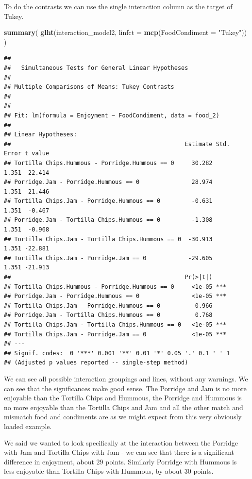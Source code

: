 \documentclass[
]{book}
\newenvironment{Shaded}{\begin{snugshade}}{\end{snugshade}}
\newcommand{\DataTypeTok}[1]{\textcolor[rgb]{0.13,0.29,0.53}{#1}}
\newcommand{\KeywordTok}[1]{\textcolor[rgb]{0.13,0.29,0.53}{\textbf{#1}}}
\newcommand{\NormalTok}[1]{#1}
\newcommand{\StringTok}[1]{\textcolor[rgb]{0.31,0.60,0.02}{#1}}
\begin{document}
To do the contrasts we can use the single interaction column as the target of Tukey.

\begin{Shaded}
\begin{Highlighting}[]
\KeywordTok{summary}\NormalTok{(}
  \KeywordTok{glht}\NormalTok{(interaction_model2, }\DataTypeTok{linfct =} \KeywordTok{mcp}\NormalTok{(}\DataTypeTok{FoodCondiment =} \StringTok{"Tukey"}\NormalTok{))}
\NormalTok{  )}
\end{Highlighting}
\end{Shaded}

\begin{verbatim}
## 
## 	 Simultaneous Tests for General Linear Hypotheses
## 
## Multiple Comparisons of Means: Tukey Contrasts
## 
## 
## Fit: lm(formula = Enjoyment ~ FoodCondiment, data = food_2)
## 
## Linear Hypotheses:
##                                                  Estimate Std. Error t value
## Tortilla Chips.Hummous - Porridge.Hummous == 0     30.282      1.351  22.414
## Porridge.Jam - Porridge.Hummous == 0               28.974      1.351  21.446
## Tortilla Chips.Jam - Porridge.Hummous == 0         -0.631      1.351  -0.467
## Porridge.Jam - Tortilla Chips.Hummous == 0         -1.308      1.351  -0.968
## Tortilla Chips.Jam - Tortilla Chips.Hummous == 0  -30.913      1.351 -22.881
## Tortilla Chips.Jam - Porridge.Jam == 0            -29.605      1.351 -21.913
##                                                  Pr(>|t|)    
## Tortilla Chips.Hummous - Porridge.Hummous == 0     <1e-05 ***
## Porridge.Jam - Porridge.Hummous == 0               <1e-05 ***
## Tortilla Chips.Jam - Porridge.Hummous == 0          0.966    
## Porridge.Jam - Tortilla Chips.Hummous == 0          0.768    
## Tortilla Chips.Jam - Tortilla Chips.Hummous == 0   <1e-05 ***
## Tortilla Chips.Jam - Porridge.Jam == 0             <1e-05 ***
## ---
## Signif. codes:  0 '***' 0.001 '**' 0.01 '*' 0.05 '.' 0.1 ' ' 1
## (Adjusted p values reported -- single-step method)
\end{verbatim}

We can see all possible interaction groupings and lines, without any warnings. We can see that the significances make good sense. The Porridge and Jam is no more enjoyable than the Tortilla Chips and Hummous, the Porridge and Hummous is no more enjoyable than the Tortilla Chips and Jam and all the other match and mismatch food and condiments are as we might expect from this very obviously loaded example.

We said we wanted to look specifically at the interaction between the Porridge with Jam and Tortilla Chips with Jam - we can see that there is a significant difference in enjoyment, about 29 points. Similarly Porridge with Hummous is less enjoyable than Tortilla Chips with Hummous, by about 30 points.
\end{document}
